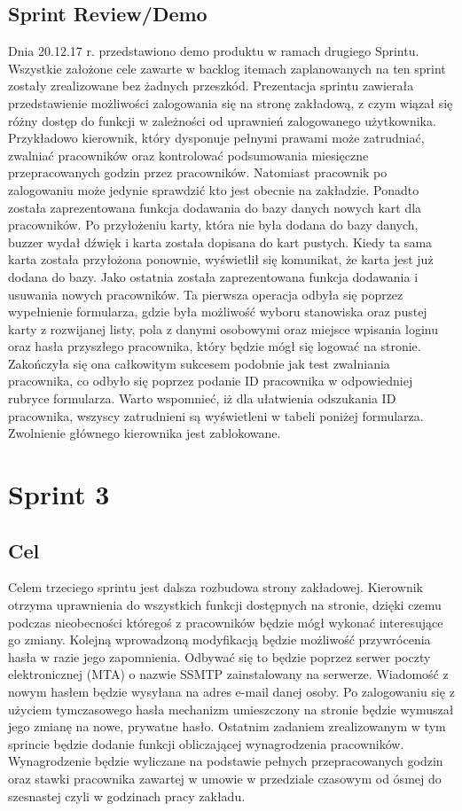 \documentclass[a4paper]{article}
\begin{document}
\subsection{Sprint Review/Demo}
Dnia 20.12.17 r. przedstawiono demo produktu w ramach drugiego Sprintu. Wszystkie założone cele zawarte w backlog itemach zaplanowanych na ten sprint zostały zrealizowane bez żadnych przeszkód. Prezentacja sprintu zawierała przedstawienie możliwości zalogowania się na stronę zakładową, z czym wiązał się różny dostęp do funkcji w zależności od uprawnień zalogowanego użytkownika. Przykładowo kierownik, który dysponuje pełnymi prawami może zatrudniać, zwalniać pracowników oraz kontrolować podsumowania miesięczne przepracowanych godzin przez pracowników. Natomiast pracownik po zalogowaniu może jedynie sprawdzić kto jest obecnie na zakładzie. Ponadto została zaprezentowana funkcja dodawania do bazy danych nowych kart dla pracowników. Po przyłożeniu karty, która nie była dodana do bazy danych, buzzer wydał dźwięk i karta została dopisana do kart pustych. Kiedy ta sama karta została przyłożona ponownie, wyświetlił się komunikat, że karta jest już dodana do bazy. Jako ostatnia została zaprezentowana funkcja dodawania i usuwania nowych pracowników. Ta pierwsza operacja odbyła się poprzez wypełnienie formularza, gdzie była możliwość wyboru stanowiska oraz pustej karty z rozwijanej listy, pola z danymi osobowymi oraz miejsce wpisania loginu oraz hasła przyszłego pracownika, który będzie mógł się logować na stronie. Zakończyła się ona całkowitym sukcesem podobnie jak test zwalniania pracownika, co odbyło się poprzez podanie ID pracownika w odpowiedniej rubryce formularza. Warto wspomnieć, iż dla ułatwienia odszukania ID pracownika, wszyscy zatrudnieni są wyświetleni w tabeli poniżej formularza. Zwolnienie głównego kierownika jest zablokowane.


\section{Sprint 3}

\subsection{Cel} Celem trzeciego sprintu jest dalsza rozbudowa strony zakładowej. Kierownik otrzyma uprawnienia do wszystkich funkcji dostępnych na stronie, dzięki czemu podczas nieobecności któregoś z pracowników będzie mógł wykonać interesujące go zmiany. Kolejną wprowadzoną modyfikacją będzie możliwość przywrócenia hasła w razie jego zapomnienia. Odbywać się to będzie poprzez serwer poczty elektronicznej (MTA) o nazwie SSMTP  zainstalowany na serwerze. Wiadomość z nowym hasłem będzie wysyłana na adres e-mail danej osoby. Po zalogowaniu się z użyciem tymczasowego hasła mechanizm umieszczony na stronie będzie wymuszał jego zmianę na nowe, prywatne hasło. Ostatnim zadaniem zrealizowanym w tym sprincie będzie dodanie funkcji obliczającej wynagrodzenia pracowników. Wynagrodzenie będzie wyliczane na podstawie pełnych przepracowanych godzin oraz stawki pracownika zawartej w umowie w przedziale czasowym od ósmej do szesnastej czyli w godzinach pracy zakładu. 
\end{document}
